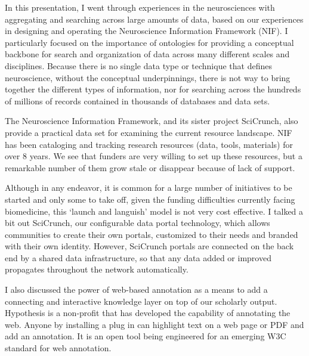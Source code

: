 \documentclass[a4paper,UKenglish]{dagrep}
\begin{document}
 


{}
\license
In this presentation, I went through experiences in the neurosciences with
aggregating and searching across large amounts of data, based on our experiences
in designing and operating the Neuroscience Information Framework (NIF).  I
particularly focused on the importance of ontologies for providing a conceptual
backbone for search and organization of data across many different scales and
disciplines.  Because there is no single data type or technique that defines
neuroscience, without the conceptual underpinnings, there is not way to bring
together the different types of information, nor for searching across the
hundreds of millions of records contained in thousands of databases and data sets.  

The Neuroscience Information Framework, and its sister project SciCrunch, also
provide a practical data set for examining the current resource landscape.  NIF
has been cataloging and tracking research resources (data, tools, materials) for
over 8 years.  We see that funders are very willing to set up these resources,
but a remarkable number of them grow stale or disappear because of lack of
support.  

Although in any endeavor, it is common for a large number of initiatives to be
started and only some to take off, given the funding difficulties currently
facing biomedicine, this `launch and languish' model is not very cost effective.
 I talked a bit out SciCrunch, our configurable data portal technology, which
allows communities to create their own portals, customized to their needs and
branded with their own identity.  However, SciCrunch portals are connected on
the back end by a shared data infrastructure, so that any data added or improved
propagates throughout the network automatically.

I also discussed the power of web-based annotation as a means to add a
connecting and interactive knowledge layer on top of our scholarly output. 
Hypothesis is a non-profit that has developed the capability of annotating the
web.  Anyone by installing a plug in can highlight text on a web page or PDF and
add an annotation.  It is an open tool being engineered for an emerging W3C
standard for web annotation.
\end{document}
